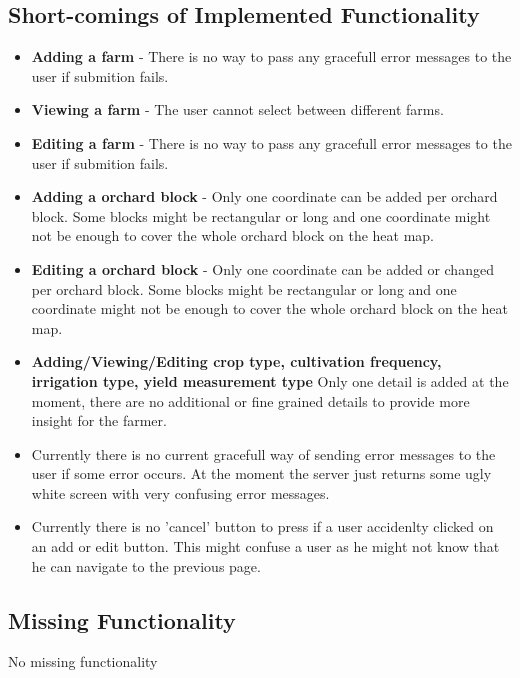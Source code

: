 \documentclass[11pt,fleqn]{book} %
\begin{document}
		\subsection{Short-comings of Implemented Functionality}
			\begin{itemize}
				\item\textbf{Adding a farm} -
				There is no way to pass any gracefull error messages to the user if submition fails.
				
				\item\textbf{Viewing a farm} -
				The user cannot select between different farms.
				
				\item\textbf{Editing a farm} -
				There is no way to pass any gracefull error messages to the user if submition fails.
				
				\item\textbf{Adding a orchard block} -
				Only one coordinate can be added per orchard block. Some blocks might be rectangular or long and one coordinate might not be enough to cover the whole orchard block on the heat map.
				
				
				\item\textbf{Editing a orchard block} -
				Only one coordinate can be added or changed per orchard block. Some blocks might be rectangular or long and one coordinate might not be enough to cover the whole orchard block on the heat map.
				
				\item \textbf{Adding/Viewing/Editing crop type, cultivation frequency, irrigation type, yield measurement type}
				Only one detail is added at the moment, there are no additional or fine grained details to provide more insight for the farmer.
				
				\item Currently there is no current gracefull way of sending error messages to the user if some error occurs. At the moment the server just returns some ugly white screen with very confusing error messages.
				
				\item Currently there is no 'cancel' button to press if a user accidenlty clicked on an add or edit button. This might confuse a user as he might not know that he can navigate to the previous page.
			\end{itemize}
		\subsection{Missing Functionality}			
				No missing functionality			
\end{document}
